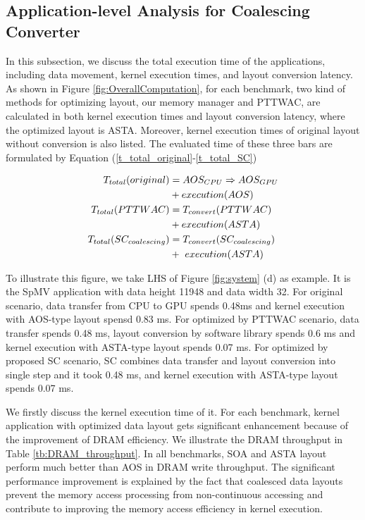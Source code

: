 \documentclass[10pt,journal,compsoc]{IEEEtran}
\begin{document}
\subsection{Application-level Analysis for Coalescing Converter}
In this subsection, we discuss the total execution time of the applications, including data movement, kernel execution times, and layout conversion latency.
As shown in Figure \ref{fig:OverallComputation}, for each benchmark, two kind of methods for optimizing layout, our memory manager and PTTWAC, are calculated in both kernel execution times and layout conversion latency, where the optimized layout is ASTA.
Moreover, kernel execution times of original layout without conversion is also listed.
The evaluated time of these three bars are formulated by Equation (\ref{t_total_original}-\ref{t_total_SC})

\begin{align}
\footnotesize
T_{total}(original)& =
 AOS_{CPU}\Rightarrow AOS_{GPU}\notag \\
 &+ execution(AOS) \label{t_total_original}\\
T_{total}(PTTWAC)&= T_{convert}(PTTWAC)  \notag \\
&+execution(ASTA) \label{t_total_PTTWAC}\\
T_{total}(SC_{coalescing})&=
 T_{convert}(SC_{coalescing})  \notag \\
& +\ execution(ASTA)  \label{t_total_SC}
\end{align}

To illustrate this figure, we take LHS of Figure \ref{fig:system} (d) as example. It is the SpMV application with data height 11948 and data width 32. For original scenario, data transfer from CPU to GPU spends 0.48ms and kernel execution  with AOS-type layout spensd 0.83 ms. For optimized by PTTWAC\cite{ASTA} scenario, data transfer spends 0.48 ms, layout conversion by software library spends 0.6 ms and kernel execution with ASTA-type layout spends 0.07 ms. For optimized by proposed SC scenario, SC combines data transfer and layout conversion into single step and it took 0.48 ms, and kernel execution with ASTA-type layout spends 0.07 ms.

We firstly discuss the kernel execution time of it. For each benchmark, kernel application with optimized data layout gets significant enhancement because of the improvement of DRAM efficiency. We illustrate the DRAM throughput in Table \ref{tb:DRAM_throughput}. In all benchmarks, SOA and ASTA layout perform much better than AOS in DRAM write throughput.
The significant performance improvement is explained by the fact that coalesced data layouts prevent the memory access processing from non-continuous accessing and contribute to improving the memory access efficiency in kernel execution.
\end{document}
